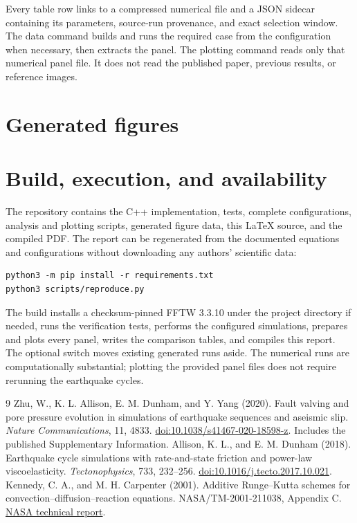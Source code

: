 \documentclass[11pt]{article}
\newcommand{\code}[1]{\texttt{\detokenize{#1}}}
\begin{document}
Every table row links to a compressed numerical file and a JSON sidecar containing
its parameters, source-run provenance, and exact selection window. The data
command builds and runs the required case from the configuration when necessary,
then extracts the panel. The plotting command reads only that numerical panel
file. It does not read the published paper, previous results, or reference images.


\section{Generated figures}


\clearpage
\section{Build, execution, and availability}
The repository contains the C++ implementation, tests, complete configurations,
analysis and plotting scripts, generated figure data, this LaTeX source, and the
compiled PDF. The report can be regenerated from the documented equations and
configurations without downloading any authors' scientific data:
\begin{verbatim}
python3 -m pip install -r requirements.txt
python3 scripts/reproduce.py
\end{verbatim}
The build installs a checksum-pinned FFTW 3.3.10 under the project directory if
needed, runs the verification tests, performs the configured simulations, prepares
and plots every panel, writes the comparison tables, and compiles this report.
The optional \code{--fresh} switch moves existing generated runs aside. The
numerical runs are computationally substantial; plotting the provided panel
files does not require rerunning the earthquake cycles.



\begin{thebibliography}{9}
 Zhu, W., K. L. Allison, E. M. Dunham, and Y. Yang (2020).
Fault valving and pore pressure evolution in simulations of earthquake sequences
and aseismic slip. \emph{Nature Communications}, 11, 4833.
\href{https://doi.org/10.1038/s41467-020-18598-z}{doi:10.1038/s41467-020-18598-z}.
Includes the published Supplementary Information.
 Allison, K. L., and E. M. Dunham (2018).
Earthquake cycle simulations with rate-and-state friction and power-law viscoelasticity.
\emph{Tectonophysics}, 733, 232--256.
\href{https://doi.org/10.1016/j.tecto.2017.10.021}{doi:10.1016/j.tecto.2017.10.021}.
 Kennedy, C. A., and M. H. Carpenter (2001).
Additive Runge--Kutta schemes for convection--diffusion--reaction equations.
NASA/TM-2001-211038, Appendix C.
\href{https://ntrs.nasa.gov/citations/20010075154}{NASA technical report}.
\end{thebibliography}
\end{document}
